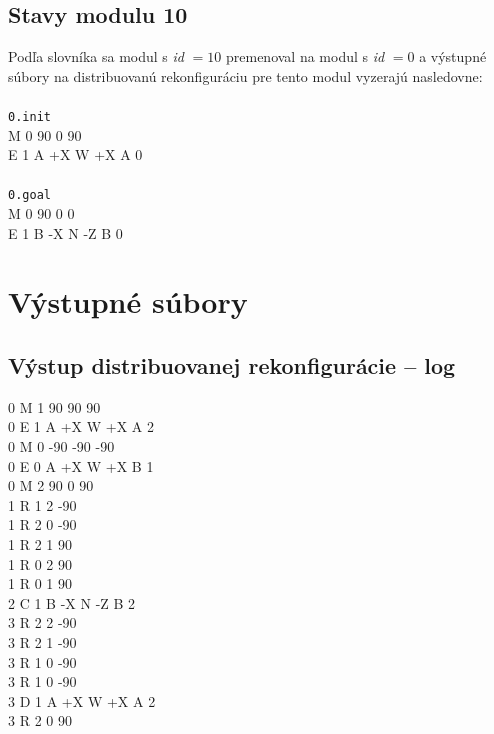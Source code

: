 \documentclass[
  printed, %
  oneside, %
  notable,   %
  nolof,     %
  nolot,     %
]{fithesis3}
\begin{document}
\subsection{Stavy modulu 10}
\label{sec:algoInput}
Podľa slovníka sa modul s \textit{id} $= 10$ premenoval na modul s \textit{id} $= 0$ a výstupné súbory na distribuovanú rekonfiguráciu pre tento modul vyzerajú nasledovne: \\ \\
\texttt{0.init} \\
M 0 90 0 90 \\
E 1 A +X W +X A 0 \\
\\
\texttt{0.goal} \\
M 0 90 0 0 \\
E 1 B -X N -Z B 0 \\

\section{Výstupné súbory}
\subsection{Výstup distribuovanej rekonfigurácie -- log} 
\label{sec:log}
0 M 1 90 90 90 \\
0 E 1 A +X W +X A 2 \\
0 M 0 -90 -90 -90 \\
0 E 0 A +X W +X B 1 \\
0 M 2 90 0 90 \\
1 R 1 2 -90 \\
1 R 2 0 -90 \\
1 R 2 1 90 \\
1 R 0 2 90 \\
1 R 0 1 90 \\ 
2 C 1 B -X N -Z B 2 \\
3 R 2 2 -90 \\
3 R 2 1 -90 \\
3 R 1 0 -90 \\
3 R 1 0 -90 \\
3 D 1 A +X W +X A 2 \\
3 R 2 0 90 
\end{document}
